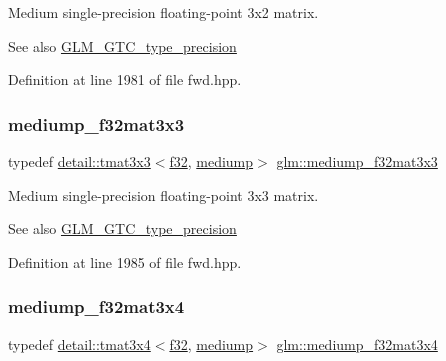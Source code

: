 Medium single-\/precision floating-\/point 3x2 matrix. \begin{DoxySeeAlso}{See also}
\hyperlink{group__gtc__type__precision}{G\+L\+M\+\_\+\+G\+T\+C\+\_\+type\+\_\+precision} 
\end{DoxySeeAlso}


Definition at line 1981 of file fwd.\+hpp.

\mbox{\label{group__gtc__type__precision_gad4d01189a1462366b143c5cbc3de0ea9}} 
\subsubsection{\texorpdfstring{mediump\+\_\+f32mat3x3}{mediump\_f32mat3x3}}
{\footnotesize\ttfamily typedef \hyperlink{structglm_1_1detail_1_1tmat3x3}{detail\+::tmat3x3}$<$\hyperlink{group__gtc__type__precision_ga0ec999b57f5330d9021256e96038df04}{f32}, \hyperlink{namespaceglm_a0f04f086094c747d227af4425893f545a6416f3ea0c9025fb21ed50c4d6620482}{mediump}$>$ \hyperlink{group__gtc__type__precision_gad4d01189a1462366b143c5cbc3de0ea9}{glm\+::mediump\+\_\+f32mat3x3}}

Medium single-\/precision floating-\/point 3x3 matrix. \begin{DoxySeeAlso}{See also}
\hyperlink{group__gtc__type__precision}{G\+L\+M\+\_\+\+G\+T\+C\+\_\+type\+\_\+precision} 
\end{DoxySeeAlso}


Definition at line 1985 of file fwd.\+hpp.

\mbox{\label{group__gtc__type__precision_ga7ad59b967576d930f4c8aa7b8c48e1af}} 
\subsubsection{\texorpdfstring{mediump\+\_\+f32mat3x4}{mediump\_f32mat3x4}}
{\footnotesize\ttfamily typedef \hyperlink{structglm_1_1detail_1_1tmat3x4}{detail\+::tmat3x4}$<$\hyperlink{group__gtc__type__precision_ga0ec999b57f5330d9021256e96038df04}{f32}, \hyperlink{namespaceglm_a0f04f086094c747d227af4425893f545a6416f3ea0c9025fb21ed50c4d6620482}{mediump}$>$ \hyperlink{group__gtc__type__precision_ga7ad59b967576d930f4c8aa7b8c48e1af}{glm\+::mediump\+\_\+f32mat3x4}}

